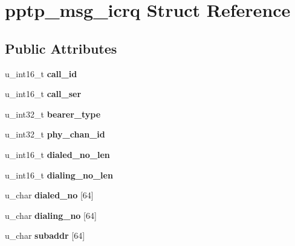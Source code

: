 \hypertarget{structpptp__msg__icrq}{
\section{pptp\_\-msg\_\-icrq Struct Reference}
\label{structpptp__msg__icrq}
}
\subsection*{Public Attributes}
\begin{DoxyCompactItemize}
\item 
\hypertarget{structpptp__msg__icrq_a85d26a1f002a9112c5b2059d094d7948}{
u\_\-int16\_\-t {\bfseries call\_\-id}}
\label{structpptp__msg__icrq_a85d26a1f002a9112c5b2059d094d7948}

\item 
\hypertarget{structpptp__msg__icrq_a4d0fa924c7952f0b2b3c637b0f346414}{
u\_\-int16\_\-t {\bfseries call\_\-ser}}
\label{structpptp__msg__icrq_a4d0fa924c7952f0b2b3c637b0f346414}

\item 
\hypertarget{structpptp__msg__icrq_a7ddfb487df6498d8eae38062fa7ec48f}{
u\_\-int32\_\-t {\bfseries bearer\_\-type}}
\label{structpptp__msg__icrq_a7ddfb487df6498d8eae38062fa7ec48f}

\item 
\hypertarget{structpptp__msg__icrq_ad224f1537a6b82d9644e0d435d5ec816}{
u\_\-int32\_\-t {\bfseries phy\_\-chan\_\-id}}
\label{structpptp__msg__icrq_ad224f1537a6b82d9644e0d435d5ec816}

\item 
\hypertarget{structpptp__msg__icrq_a6f0cea7360d789979193ed401a749b73}{
u\_\-int16\_\-t {\bfseries dialed\_\-no\_\-len}}
\label{structpptp__msg__icrq_a6f0cea7360d789979193ed401a749b73}

\item 
\hypertarget{structpptp__msg__icrq_a9a43d192c6de3c0b20134e3d73e1f988}{
u\_\-int16\_\-t {\bfseries dialing\_\-no\_\-len}}
\label{structpptp__msg__icrq_a9a43d192c6de3c0b20134e3d73e1f988}

\item 
\hypertarget{structpptp__msg__icrq_a3fc8cd16e68244805b5f117b9fda1edd}{
u\_\-char {\bfseries dialed\_\-no} \mbox{[}64\mbox{]}}
\label{structpptp__msg__icrq_a3fc8cd16e68244805b5f117b9fda1edd}

\item 
\hypertarget{structpptp__msg__icrq_ab622d0bd6654ed4db7f6ac620e642450}{
u\_\-char {\bfseries dialing\_\-no} \mbox{[}64\mbox{]}}
\label{structpptp__msg__icrq_ab622d0bd6654ed4db7f6ac620e642450}

\item 
\hypertarget{structpptp__msg__icrq_afb02987bf8378ce01511452930796f0b}{
u\_\-char {\bfseries subaddr} \mbox{[}64\mbox{]}}
\label{structpptp__msg__icrq_afb02987bf8378ce01511452930796f0b}

\end{DoxyCompactItemize}


